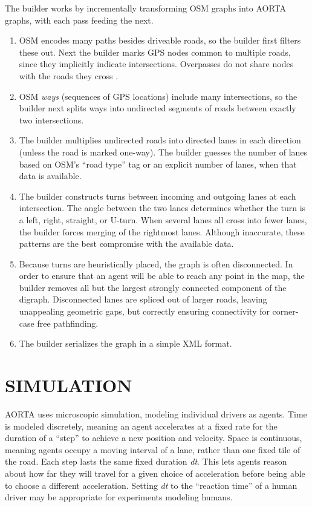 \documentclass[letterpaper, 10 pt, conference]{ieeeconf}  %
\begin{document}
The builder works by incrementally transforming OSM graphs into AORTA graphs,
with each pass feeding the next.
\begin{enumerate}
  \item OSM encodes many paths besides driveable roads, so the builder first filters
        these out. Next the builder marks GPS nodes common to multiple roads, since
        they implicitly indicate intersections. Overpasses do not share nodes
        with the roads they cross \cite{osmOverpass}.
  \item OSM \emph{ways} (sequences of GPS locations) include many
        intersections, so the builder next splits ways into undirected
        segments of roads between exactly two intersections.
  \item The builder multiplies undirected roads into directed lanes in each
        direction (unless the road is marked one-way). The builder guesses the
        number of lanes based on OSM's ``road type'' tag or an explicit number of
        lanes, when that data is available.
  \item The builder constructs turns between incoming and outgoing lanes at each
        intersection. The angle between the two lanes determines whether the turn is
        a left, right, straight, or U-turn. When several lanes all cross into fewer
        lanes, the builder forces merging of the rightmost lanes. Although
        inaccurate, these patterns are the best compromise with the available data.
  \item Because turns are heuristically placed, the graph is often disconnected.
        In order to ensure that an agent will be able to reach any point in the map,
        the builder removes all but the largest strongly connected component of the
        digraph.  Disconnected lanes are spliced out of larger roads, leaving
        unappealing geometric gaps, but correctly ensuring connectivity for
        corner-case free pathfinding.
  \item The builder serializes the graph in a simple XML format.
\end{enumerate}


\section{SIMULATION}
\label{sec:simulation}

AORTA uses microscopic simulation, modeling individual drivers as agents.
Time is modeled discretely, meaning an agent accelerates at a fixed rate for
the duration of a ``step'' to achieve a new position and velocity. Space is
continuous, meaning agents occupy a moving interval of a lane, rather than one
fixed tile of the road. Each step lasts the same fixed duration \textit{dt}.
This lets agents reason about how far they will travel for a given choice of
acceleration before being able to choose a different acceleration. Setting
\textit{dt} to the ``reaction time'' of a human driver may be appropriate for
experiments modeling humans.
\end{document}
